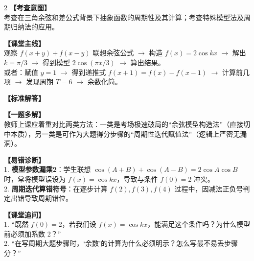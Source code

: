 \documentclass[11pt,a4paper]{ctexart}
\begin{document}
\begin{paracol}{2}
  \textbf{【考查意图】}\\
  考查在三角余弦和差公式背景下抽象函数的周期性及其计算；考查特殊模型法及周期归纳法的应用。
  
  \textbf{【课堂主线】}\\
  观察 \(f(x+y)+f(x-y)\) 联想余弦公式 \(\to\) 构造 \(f(x)=2\cos kx\) \(\to\) 解出 \(k = \pi/3\) \(\to\) 得到模型 \(2\cos(\pi x/3)\) \(\to\) 算出结果。\\
  或者：赋值 \(y=1\) \(\to\) 得到递推式 \(f(x+1)=f(x)-f(x-1)\) \(\to\) 计算前几项 \(\to\) 发现周期 \(T=6\) \(\to\) 余数化简。
  
  \textbf{【标准解答】}\\
  \qSixSolution
  
  \textbf{【一题多解】}\\
  教师上课应着重对比两类方法：一类是考场极速破局的“余弦模型构造法”（直接切中本质），另一类是可作为大题得分步骤的“周期性迭代赋值法”（逻辑上严密无漏洞）。

  \switchcolumn
  \textbf{【易错诊断】}\\
  1. \textbf{模型参数漏乘2}：学生联想 \(\cos(A+B)+\cos(A-B)=2\cos A\cos B\) 时，常将模型误设为 \(f(x)=\cos kx\)，导致与条件 \(f(0)=2\) 冲突。\\
  2. \textbf{周期迭代算错符号}：在逐步计算 \(f(2), f(3), f(4)\) 过程中，因减法正负号判定出错导致周期错位。
  
  \textbf{【课堂追问】}\\
  1. “既然 \(f(0)=2\)，若我们设 \(f(x)=\cos kx\)，能满足这个条件吗？为什么模型前必须加系数 2？”\\
  2. “在写周期大题步骤时，‘余数’的计算为什么必须明示？怎么写最不易丢步骤分？”
\end{paracol}

\vspace{0.8em}
\par{}
\vspace{0.8em}

{\small
\qSevenStem
}
\end{document}
